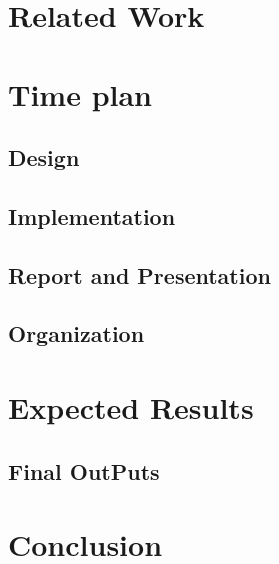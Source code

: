 \documentclass[titlepage]{report}
\begin{document}

\chapter{Related Work}
\lipsum[3]



\chapter{Time plan}

\section{Design}
\lipsum[3]

\section{Implementation}
\lipsum[3]

\section{Report and Presentation}
\lipsum[3]

\section{Organization}
\lipsum[3]



\chapter{Expected Results}
\lipsum[3]

\section{Final OutPuts}

\lipsum[3]


\chapter{Conclusion}

\lipsum[2]

\end{document}
